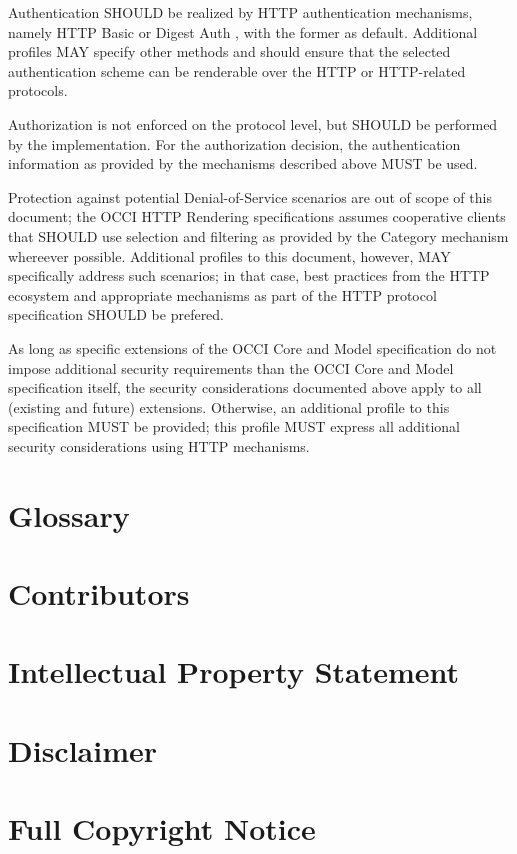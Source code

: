 \documentclass[10pt,a4paper]{article}
\begin{document}
Authentication SHOULD be realized by HTTP authentication mechanisms,
namely HTTP Basic or Digest Auth \cite{rfc2617}, with the former as
default. Additional profiles MAY specify other methods and should
ensure that the selected authentication scheme can be renderable over
the HTTP or HTTP-related protocols.

Authorization is not enforced on the protocol level, but SHOULD be
performed by the implementation. For the authorization decision, the
authentication information as provided by the mechanisms described
above MUST be used.

Protection against potential Denial-of-Service scenarios are out of
scope of this document; the OCCI HTTP Rendering specifications assumes
cooperative clients that SHOULD use selection and filtering as
provided by the Category mechanism whereever possible. Additional
profiles to this document, however, MAY specifically address such
scenarios; in that case, best practices from the HTTP ecosystem and
appropriate mechanisms as part of the HTTP protocol specification
SHOULD be prefered.

As long as specific extensions of the OCCI Core and Model
specification do not impose additional security requirements than the
OCCI Core and Model specification itself, the security considerations
documented above apply to all (existing and future)
extensions. Otherwise, an additional profile to this specification
MUST be provided; this profile MUST express all additional security
considerations using HTTP mechanisms.

\section{Glossary}
\label{sec:glossary}

 
\section{Contributors}


\section{Intellectual Property Statement}


\section{Disclaimer}


\section{Full Copyright Notice}




\end{document}
